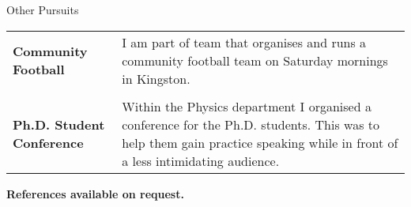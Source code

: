 \documentclass{resume} %
\begin{document}
\begin{rSection}{Other Pursuits}
\begin{tabular}{p{5cm}p{10.5cm}}
	{\bf Community Football}& {I am part of team that organises and runs a community football team on Saturday mornings in Kingston.}\\ 
	\\
	{\bf Ph.D. Student Conference}& {Within the Physics department I organised a conference for the Ph.D. students. This was to help them gain practice speaking while in front of a less intimidating audience.} 
	\\
\end{tabular}
\end{rSection}


\textbf{References available on request.}
\end{document}
